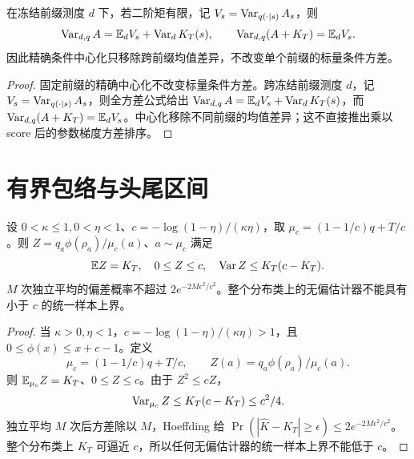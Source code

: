 \begin{proposition}[跨前缀中心化的总方差分解]
在冻结前缀测度 $d$ 下，若二阶矩有限，记 $V_s=\operatorname{Var}_{q(\cdot\mid s)}A_s$，则
\begin{equation}
\operatorname{Var}_{d,q}A=\mathbb E_dV_s+\operatorname{Var}_dK_T(s),\qquad
\operatorname{Var}_{d,q}(A+K_T)=\mathbb E_dV_s.
\end{equation}
因此精确条件中心化只移除跨前缀均值差异，不改变单个前缀的标量条件方差。
\end{proposition}
\begin{proof}
固定前缀的精确中心化不改变标量条件方差。跨冻结前缀测度 $d$，记 $V_s=\operatorname{Var}_{q(\cdot\mid s)}A_s$，则全方差公式给出 $\operatorname{Var}_{d,q}A=\mathbb E_dV_s+\operatorname{Var}_dK_T(s)$，而 $\operatorname{Var}_{d,q}(A+K_T)=\mathbb E_dV_s$。中心化移除不同前缀的均值差异；这不直接推出乘以 score 后的参数梯度方差排序。
\end{proof}

\section{有界包络与头尾区间}
\begin{theorem}[有界非负无偏中心估计]
设 $0<\kappa\le1,0<\eta<1$、$c=-\log(1-\eta)/(\kappa\eta)$，取 $\mu_c=(1-1/c)q+T/c$。则 $Z=q_a\phi(\rho_a)/\mu_c(a)$、$a\sim\mu_c$ 满足
\begin{equation}
\mathbb E Z=K_T,\quad0\le Z\le c,\quad\operatorname{Var} Z\le K_T(c-K_T).
\end{equation}
$M$ 次独立平均的偏差概率不超过 $2e^{-2M\epsilon^2/c^2}$。整个分布类上的无偏估计器不能具有小于 $c$ 的统一样本上界。
\end{theorem}
\begin{proof}
当 $\kappa>0,\eta<1$，$c=-\log(1-\eta)/(\kappa\eta)>1$，且 $0\le\phi(x)\le x+c-1$。定义
\begin{equation}
\mu_c=(1-1/c)q+T/c,\qquad Z(a)=q_a\phi(\rho_a)/\mu_c(a).
\end{equation}
则 $\mathbb E_{\mu_c}Z=K_T$、$0\le Z\le c$。由于 $Z^2\le cZ$，
\begin{equation}
\operatorname{Var}_{\mu_c}Z\le K_T(c-K_T)\le c^2/4.
\end{equation}
独立平均 $M$ 次后方差除以 $M$，Hoeffding 给 $\Pr(|\widehat K-K_T|\ge\epsilon)\le2e^{-2M\epsilon^2/c^2}$。整个分布类上 $K_T$ 可逼近 $c$，所以任何无偏估计器的统一样本上界不能低于 $c$。
\end{proof}

